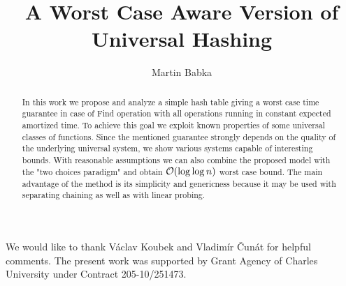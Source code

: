 \documentclass{article}
\begin{document}
\title{A Worst Case Aware Version of Universal Hashing}

\author{Martin Babka}


\begin{abstract}
In this work we propose and analyze a simple hash table giving a worst case time guarantee in case of Find operation with all operations running in constant expected amortized time.
To achieve this goal we exploit known properties of some universal classes of functions.
Since the mentioned guarantee strongly depends on the quality of the underlying universal system, we show various systems capable of interesting bounds.
With reasonable assumptions we can also combine the proposed model with the "two choices paradigm" and obtain $\mathcal{O}(\log \log n)$ worst case bound.
The main advantage of the method is its simplicity and genericness because it may be used with separating chaining as well as with linear probing.
\end{abstract}

\begin{article}






\acknowledgments %
{We would like to thank Václav Koubek and Vladimír Čunát for helpful comments.
The  present  work  was  supported by Grant Agency of Charles University under Contract 205-10/251473.}



\end{article}
\end{document}

